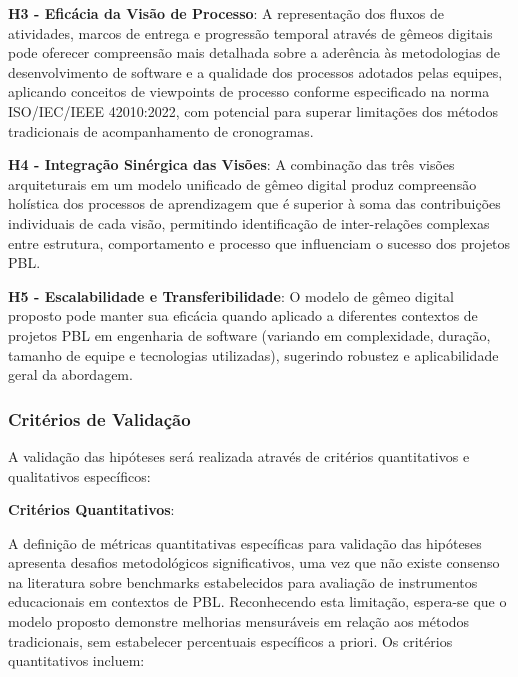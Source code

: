 \documentclass[12pt,a4paper]{article}
\begin{document}
\textbf{H3 - Eficácia da Visão de Processo}: A representação dos fluxos de atividades, marcos de entrega e progressão temporal através de gêmeos digitais pode oferecer compreensão mais detalhada sobre a aderência às metodologias de desenvolvimento de software e a qualidade dos processos adotados pelas equipes, aplicando conceitos de viewpoints de processo conforme especificado na norma ISO/IEC/IEEE 42010:2022, com potencial para superar limitações dos métodos tradicionais de acompanhamento de cronogramas.

\textbf{H4 - Integração Sinérgica das Visões}: A combinação das três visões arquiteturais em um modelo unificado de gêmeo digital produz compreensão holística dos processos de aprendizagem que é superior à soma das contribuições individuais de cada visão, permitindo identificação de inter-relações complexas entre estrutura, comportamento e processo que influenciam o sucesso dos projetos PBL.

\textbf{H5 - Escalabilidade e Transferibilidade}: O modelo de gêmeo digital proposto pode manter sua eficácia quando aplicado a diferentes contextos de projetos PBL em engenharia de software (variando em complexidade, duração, tamanho de equipe e tecnologias utilizadas), sugerindo robustez e aplicabilidade geral da abordagem.

\subsubsection{Critérios de Validação}

A validação das hipóteses será realizada através de critérios quantitativos e qualitativos específicos:

\textbf{Critérios Quantitativos}:

A definição de métricas quantitativas específicas para validação das hipóteses apresenta desafios metodológicos significativos, uma vez que não existe consenso na literatura sobre benchmarks estabelecidos para avaliação de instrumentos educacionais em contextos de PBL. Reconhecendo esta limitação, espera-se que o modelo proposto demonstre melhorias mensuráveis em relação aos métodos tradicionais, sem estabelecer percentuais específicos a priori. Os critérios quantitativos incluem:
\end{document}
